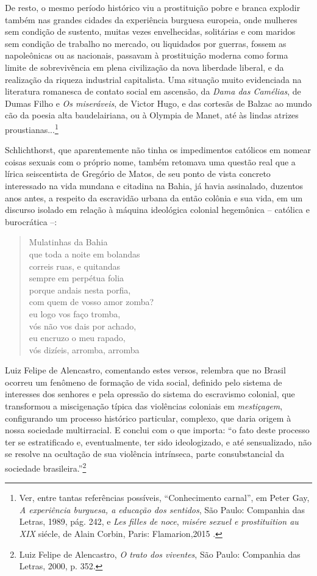 De resto, o mesmo período histórico viu a prostituição pobre e branca
explodir também nas grandes cidades da experiência burguesa europeia,
onde mulheres sem condição de sustento, muitas vezes envelhecidas,
solitárias e com maridos sem condição de trabalho no mercado, ou
liquidados por guerras, fossem as napoleônicas ou as nacionais, passavam
à prostituição moderna como forma limite de sobrevivência em plena
civilização da nova liberdade liberal, e da realização da riqueza
industrial capitalista. Uma situação muito evidenciada na literatura
romanesca de contato social em ascensão, da \emph{Dama das Camélias}, de
Dumas Filho e \emph{Os miseráveis}, de Victor Hugo, e das cortesãs de
Balzac ao mundo cão da poesia alta baudelairiana, ou à Olympia de Manet,
até às lindas atrizes proustianas...\footnote{Ver, entre tantas
  referências possíveis, ``Conhecimento carnal'', em Peter Gay, \emph{A
  experiência burguesa, a educação dos sentidos}, São Paulo: Companhia
  das Letras, 1989, pág. 242, e \emph{Les filles de noce}, \emph{misére
  sexuel e prostituition au XIX} siécle, de Alain Corbin, Paris:
  Flamarion,2015 .}

Schlichthorst, que aparentemente não tinha os impedimentos católicos em
nomear coisas sexuais com o próprio nome, também retomava uma questão
real que a lírica seiscentista de Gregório de Matos, de seu ponto de
vista concreto interessado na vida mundana e citadina na Bahia, já havia
assinalado, duzentos anos antes, a respeito da escravidão urbana da
então colônia e sua vida, em um discurso isolado em relação à máquina
ideológica colonial hegemônica -- católica e burocrática --:

\begin{verse}
Mulatinhas da Bahia\\
que toda a noite em bolandas\\
correis ruas, e quitandas\\
sempre em perpétua folia\\
porque andais nesta porfia,\\
com quem de vosso amor zomba?\\
eu logo vos faço tromba,\\
vós não vos dais por achado,\\
eu encruzo o meu rapado,\\
vós dizíeis, arromba, arromba
\end{verse}

Luiz Felipe de Alencastro, comentando estes versos, relembra que no
Brasil ocorreu um fenômeno de formação de vida social, definido pelo
sistema de interesses dos senhores e pela opressão do sistema do
escravismo colonial, que transformou a miscigenação típica das
violências coloniais em \emph{mestiçagem}, configurando um processo
histórico particular, complexo, que daria origem à nossa sociedade
multirracial. E conclui com o que importa: ``o fato deste processo ter
se estratificado e, eventualmente, ter sido ideologizado, e até
sensualizado, não se resolve na ocultação de sua violência intrínseca,
parte consubstancial da sociedade brasileira.''\footnote{Luiz Felipe de
  Alencastro, \emph{O trato dos viventes}, São Paulo: Companhia das
  Letras, 2000, p. 352.}

